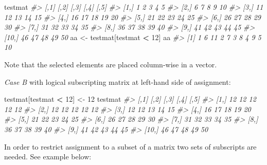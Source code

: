 \documentclass[
]{book}
\newenvironment{Shaded}{\begin{snugshade}}{\end{snugshade}}
\newcommand{\CommentTok}[1]{\textcolor[rgb]{0.56,0.35,0.01}{\textit{#1}}}
\newcommand{\DecValTok}[1]{\textcolor[rgb]{0.00,0.00,0.81}{#1}}
\newcommand{\NormalTok}[1]{#1}
\newcommand{\OtherTok}[1]{\textcolor[rgb]{0.56,0.35,0.01}{#1}}
\newcommand{\SpecialCharTok}[1]{\textcolor[rgb]{0.81,0.36,0.00}{\textbf{#1}}}
\begin{document}
\begin{Shaded}
\begin{Highlighting}[]
\NormalTok{testmat}
\CommentTok{\#\textgreater{}       [,1] [,2] [,3] [,4] [,5]}
\CommentTok{\#\textgreater{}  [1,]    1    2    3    4    5}
\CommentTok{\#\textgreater{}  [2,]    6    7    8    9   10}
\CommentTok{\#\textgreater{}  [3,]   11   12   13   14   15}
\CommentTok{\#\textgreater{}  [4,]   16   17   18   19   20}
\CommentTok{\#\textgreater{}  [5,]   21   22   23   24   25}
\CommentTok{\#\textgreater{}  [6,]   26   27   28   29   30}
\CommentTok{\#\textgreater{}  [7,]   31   32   33   34   35}
\CommentTok{\#\textgreater{}  [8,]   36   37   38   39   40}
\CommentTok{\#\textgreater{}  [9,]   41   42   43   44   45}
\CommentTok{\#\textgreater{} [10,]   46   47   48   49   50}
\NormalTok{aa }\OtherTok{\textless{}{-}}\NormalTok{ testmat[testmat }\SpecialCharTok{\textless{}} \DecValTok{12}\NormalTok{]}
\NormalTok{aa}
\CommentTok{\#\textgreater{}  [1]  1  6 11  2  7  3  8  4  9  5 10}
\end{Highlighting}
\end{Shaded}

Note that the selected elements are placed column-wise in a vector.

\emph{Case B} with logical subscripting matrix at left-hand side of assignment:

\begin{Shaded}
\begin{Highlighting}[]
\NormalTok{testmat[testmat }\SpecialCharTok{\textless{}} \DecValTok{12}\NormalTok{] }\OtherTok{\textless{}{-}} \DecValTok{12}
\NormalTok{testmat}
\CommentTok{\#\textgreater{}       [,1] [,2] [,3] [,4] [,5]}
\CommentTok{\#\textgreater{}  [1,]   12   12   12   12   12}
\CommentTok{\#\textgreater{}  [2,]   12   12   12   12   12}
\CommentTok{\#\textgreater{}  [3,]   12   12   13   14   15}
\CommentTok{\#\textgreater{}  [4,]   16   17   18   19   20}
\CommentTok{\#\textgreater{}  [5,]   21   22   23   24   25}
\CommentTok{\#\textgreater{}  [6,]   26   27   28   29   30}
\CommentTok{\#\textgreater{}  [7,]   31   32   33   34   35}
\CommentTok{\#\textgreater{}  [8,]   36   37   38   39   40}
\CommentTok{\#\textgreater{}  [9,]   41   42   43   44   45}
\CommentTok{\#\textgreater{} [10,]   46   47   48   49   50}
\end{Highlighting}
\end{Shaded}

In order to restrict assignment to a subset of a matrix two sets of subscripts are needed. See example below:
\end{document}
